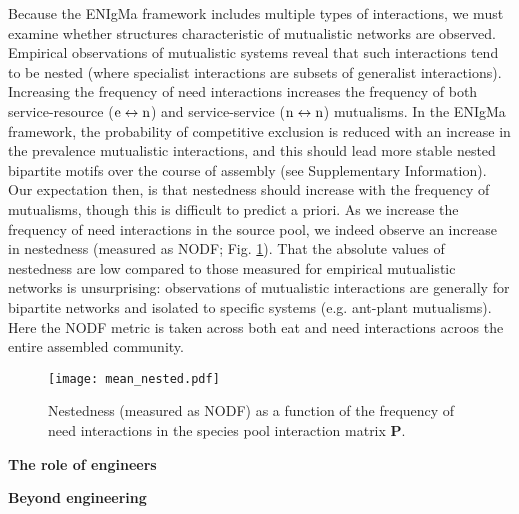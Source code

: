 \documentclass[9pt,twocolumn,twoside]{pnas-new}
\newcommand{\rr}[1]{{\rm #1}}
\begin{document}
Because the ENIgMa framework includes multiple types of interactions, we must examine whether structures characteristic of mutualistic networks are observed.
Empirical observations of mutualistic systems reveal that such interactions tend to be nested (where specialist interactions are subsets of generalist interactions).
Increasing the frequency of need interactions increases the frequency of both service-resource ($\rr{e}\leftrightarrow \rr{n}$) and service-service ($\rr{n} \leftrightarrow \rr{n}$) mutualisms.
In the ENIgMa framework, the probability of competitive exclusion is reduced with an increase in the prevalence mutualistic interactions, and this should lead more stable nested bipartite motifs over the course of assembly (see Supplementary Information).
Our expectation then, is that nestedness should increase with the frequency of mutualisms, though this is difficult to predict a priori.
As we increase the frequency of need interactions in the source pool, we indeed observe an increase in nestedness (measured as NODF; Fig. \ref{fig:nest}).
That the absolute values of nestedness are low compared to those measured for empirical mutualistic networks is unsurprising: observations of mutualistic interactions are generally for bipartite networks and isolated to specific systems (e.g. ant-plant mutualisms).
Here the NODF metric is taken across both eat and need interactions acroos the entire assembled community.

\begin{figure}
\centering
\texttt{[image: mean\_nested.pdf]}
\caption{
Nestedness (measured as NODF) as a function of the frequency of need interactions in the species pool interaction matrix $\bm P$.
}
\label{fig:nest}
\end{figure}

\noindent \textbf{The role of engineers}


\noindent \textbf{Beyond engineering}
\end{document}
